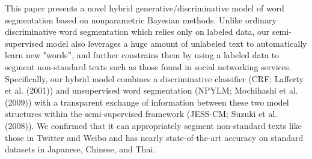 This paper presents a novel hybrid generative/discriminative model of word segmentation based on nonparametric Bayesian methods. Unlike ordinary discriminative word segmentation which relies only on labeled data, our semi-supervised model also leverages a huge amount of unlabeled text to automatically learn new "words'', and further constrains them by using a labeled data to segment non-standard texts such as those found in social networking services. Specifically, our hybrid model combines a discriminative classifier (CRF; Lafferty et al. (2001)) and unsupervised word segmentation (NPYLM; Mochihashi et al. (2009)) with a transparent exchange of information between these two model structures within the semi-supervised framework (JESS-CM; Suzuki et al. (2008)). We confirmed that it can appropriately segment non-standard texts like those in Twitter and Weibo and has nearly state-of-the-art accuracy on standard datasets in Japanese, Chinese, and Thai.
